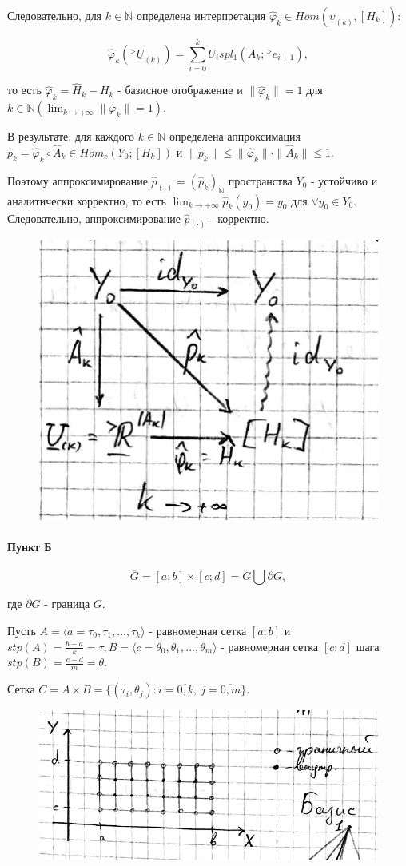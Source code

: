 \documentclass[__main__.tex]{subfiles}
\begin{document}
Следовательно, для $k \in \mathbb{N}$ определена интерпретация $\hat{\varphi}_k \in Hom \left(\underline{\upsilon}_{\left(k\right)},[H_k]\right)$:

$$
\hat{\varphi}_k \left({}^>\underline{U}_{\left(k\right)}\right) = \sum_{i=0}^k U_i spl_1 \left(A_k;{}^>e_{i+1}\right),
$$

то есть $\hat{\varphi}_k = \hat{H}_k - H_k$ - базисное отображение и $\| \hat{\varphi}_k \|=1$ для $k \in \mathbb{N} \left(\lim_{k\rightarrow + \infty} \| \varphi_k \| = 1\right)$.

В результате, для каждого $k \in \mathbb{N}$ определена аппроксимация $\hat{p}_k = \hat{\varphi}_k \circ \hat{A}_k \in Hom_c \left(Y_0;[H_k]\right)$ и $\| \hat{p}_k \| \leq \| \hat{\varphi}_k \| \cdot \| \hat{A}_k \| \leq 1$.

Поэтому аппроксимирование $\hat{p}_{\left(\cdot\right)} = \left(\hat{p}_k\right)_{\mathbb{N}}$ пространства $Y_0$ - устойчиво и аналитически корректно, то есть $\lim_{k\rightarrow + \infty} \hat{p}_k \left(y_0\right) = y_0$ для $\forall y_0 \in Y_0$. Следовательно, аппроксимирование $\hat{p}_{\left(\cdot\right)}$ - корректно.

\begin{figure}[h!]
	\centering
	\includegraphics[width=0.4\linewidth]{img/img_9-2}
	\caption{}
	\label{img9-2}
\end{figure}

\paragraph{Пункт Б}

$$\overline{G} = [a;b] \times [c;d] = G \bigcup \partial G,$$

где $\partial G$ - граница $G$.

Пусть $A = \langle a = \tau_0, \tau_1,...,\tau_k \rangle$ - равномерная сетка $[a;b]$ и $stp \left(A\right) = \frac{b-a}{k} = \tau, B = \langle c = \theta_0, \theta_1,...,\theta_m \rangle$ - равномерная сетка $[c;d]$ шага $stp \left(B\right) = \frac{c-d}{m} = \theta$.

Сетка $C = A \times B = \{\left(\tau_i,\theta_j \right): i = \overline{0,k}, \ j = \overline{0,m} \}$.

\begin{figure}[h!]
	\centering
	\includegraphics[width=0.4\linewidth]{img/img_9-3}
	\caption{}
	\label{fig:img9-3}
\end{figure}
\end{document}
